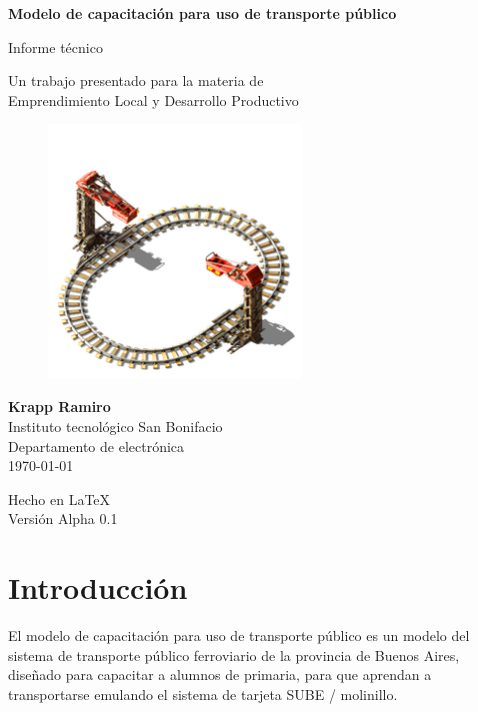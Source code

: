 \documentclass{article}
\begin{document}
\begin{titlepage}
	\begin{center}
		\vspace{1cm}

		{\Huge
			\textbf{Modelo de capacitación para uso de transporte público}}

		\vspace{0.3cm}
		{\LARGE
			Informe técnico}

		\vspace{0.5cm}
		{\Large
			Un trabajo presentado para la materia de \\
			Emprendimiento Local y Desarrollo Productivo}

		\vspace{2cm}

		\begin{figure}[H]
			\centering
			\includegraphics[width=0.6\textwidth]{logo.png}
		\end{figure}

		\vfill

		{\Large
			\textbf{Krapp Ramiro} \\
			\vspace{0.5cm}
			Instituto tecnológico San Bonifacio\\
			Departamento de electrónica\\
			\today
		}

		\vspace{0.5cm}
		{\large Hecho en {\LaTeX}\\
			Versión Alpha 0.1}

	\end{center}
\end{titlepage}

\section{Introducción}
El modelo de capacitación para uso de transporte público es un modelo 
del sistema de transporte público ferroviario de la provincia de Buenos Aires,
diseñado para capacitar a alumnos de primaria, para que aprendan a transportarse
emulando el sistema de tarjeta SUBE / molinillo.
\end{document}
